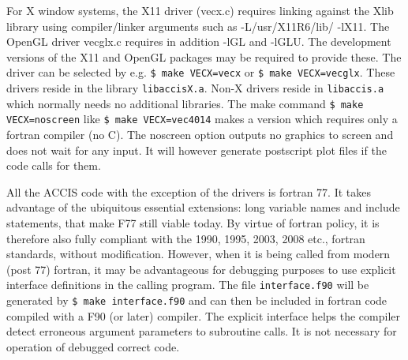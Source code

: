 \documentclass[12pt]{article}
\begin{document}
For X window systems, the X11 driver (vecx.c) requires linking against
the Xlib library using compiler/linker arguments such as
-L/usr/X11R6/lib/ -lX11.  The OpenGL driver vecglx.c requires in
addition -lGL and -lGLU. The development versions of the X11 and
OpenGL packages may be required to provide these. The driver can be
selected by e.g. \verb!$ make VECX=vecx! or  \verb!$ make VECX=vecglx!. 
These drivers reside in the library \verb!libaccisX.a!.
Non-X drivers reside in \verb!libaccis.a! which normally needs no
additional libraries. 
The make command \verb!$ make VECX=noscreen!  like \verb!$ make VECX=vec4014!
makes a version which requires only a fortran
compiler (no C). The noscreen option outputs no graphics to screen and does not
wait for any input. It will however generate postscript plot files if the code
calls for them.


All the ACCIS code with the exception of the drivers is fortran 77.
It takes advantage of the ubiquitous essential extensions: long
variable names and include statements, that make F77 still viable
today.  By virtue of fortran policy, it is therefore also fully
compliant with the 1990, 1995, 2003, 2008 etc., fortran standards,
without modification. However, when it is being called from modern
(post 77) fortran, it may be advantageous for debugging purposes to
use explicit interface definitions in the calling program. The file
\verb!interface.f90! will be generated by \verb!$ make interface.f90!
and can then be included in fortran code compiled with a F90 (or
later) compiler. The explicit interface helps the compiler detect
erroneous argument parameters to subroutine calls. It is not necessary
for operation of debugged correct code.
\end{document}
